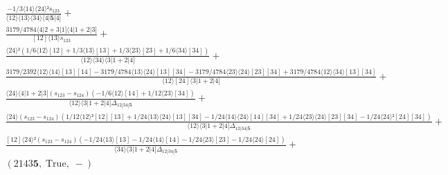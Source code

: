 \documentclass[varwidth, border=5pt]{standalone}
\begin{document}
\begin{my}
$\begin{gathered}
\scriptscriptstyle\frac{-1/3⟨14⟩⟨24⟩²s_{123}}{⟨12⟩⟨13⟩⟨34⟩⟨4|𝟓|4]} +\\
\scriptscriptstyle\frac{3179/4784⟨4|2+3|1]⟨4|1+2|3]}{[12]⟨13⟩s_{123}} +\\
\scriptscriptstyle\frac{⟨24⟩²(1/6⟨12⟩[12]+1/3⟨13⟩[13]+1/3⟨23⟩[23]+1/6⟨34⟩[34])}{⟨12⟩⟨34⟩⟨3|1+2|4]} +\\
\scriptscriptstyle\frac{3179/2392⟨12⟩⟨14⟩[13][14]-3179/4784⟨13⟩⟨24⟩[13][34]-3179/4784⟨23⟩⟨24⟩[23][34]+3179/4784⟨12⟩⟨34⟩[13][34]}{⟨12⟩[24]⟨3|1+2|4]} +\\
\scriptscriptstyle\frac{⟨24⟩⟨4|1+2|3](s_{123}-s_{124})(-1/6⟨12⟩[14]+1/12⟨23⟩[34])}{⟨12⟩⟨3|1+2|4]Δ_{12|34|𝟓}} +\\
\scriptscriptstyle\frac{⟨24⟩(s_{123}-s_{124})(1/12⟨12⟩²[12][13]+1/24⟨13⟩⟨24⟩[13][34]-1/24⟨14⟩⟨24⟩[14][34]+1/24⟨23⟩⟨24⟩[23][34]-1/24⟨24⟩²[24][34])}{⟨12⟩⟨3|1+2|4]Δ_{12|34|𝟓}} +\\
\scriptscriptstyle\frac{[12]⟨24⟩²(s_{123}-s_{124})(-1/24⟨13⟩[13]-1/24⟨14⟩[14]-1/24⟨23⟩[23]-1/24⟨24⟩[24])}{⟨34⟩⟨3|1+2|4]Δ_{12|34|𝟓}} +\\
\scriptscriptstyle(2143𝟓,\;\text{True},\;-) \phantom{+}
\end{gathered}$
\end{my}
\end{document}
